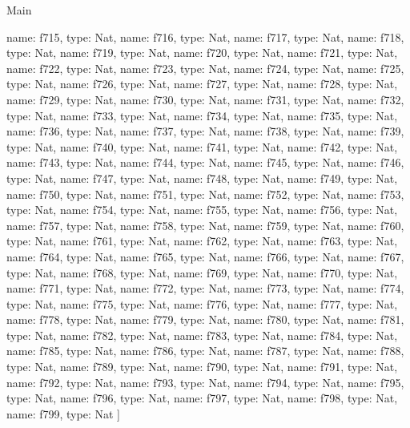 \begin{lexlean}{Main}
\begin{semanticmodule}
{    {name: f715, type: Nat},
    {name: f716, type: Nat},
    {name: f717, type: Nat},
    {name: f718, type: Nat},
    {name: f719, type: Nat},
    {name: f720, type: Nat},
    {name: f721, type: Nat},
    {name: f722, type: Nat},
    {name: f723, type: Nat},
    {name: f724, type: Nat},
    {name: f725, type: Nat},
    {name: f726, type: Nat},
    {name: f727, type: Nat},
    {name: f728, type: Nat},
    {name: f729, type: Nat},
    {name: f730, type: Nat},
    {name: f731, type: Nat},
    {name: f732, type: Nat},
    {name: f733, type: Nat},
    {name: f734, type: Nat},
    {name: f735, type: Nat},
    {name: f736, type: Nat},
    {name: f737, type: Nat},
    {name: f738, type: Nat},
    {name: f739, type: Nat},
    {name: f740, type: Nat},
    {name: f741, type: Nat},
    {name: f742, type: Nat},
    {name: f743, type: Nat},
    {name: f744, type: Nat},
    {name: f745, type: Nat},
    {name: f746, type: Nat},
    {name: f747, type: Nat},
    {name: f748, type: Nat},
    {name: f749, type: Nat},
    {name: f750, type: Nat},
    {name: f751, type: Nat},
    {name: f752, type: Nat},
    {name: f753, type: Nat},
    {name: f754, type: Nat},
    {name: f755, type: Nat},
    {name: f756, type: Nat},
    {name: f757, type: Nat},
    {name: f758, type: Nat},
    {name: f759, type: Nat},
    {name: f760, type: Nat},
    {name: f761, type: Nat},
    {name: f762, type: Nat},
    {name: f763, type: Nat},
    {name: f764, type: Nat},
    {name: f765, type: Nat},
    {name: f766, type: Nat},
    {name: f767, type: Nat},
    {name: f768, type: Nat},
    {name: f769, type: Nat},
    {name: f770, type: Nat},
    {name: f771, type: Nat},
    {name: f772, type: Nat},
    {name: f773, type: Nat},
    {name: f774, type: Nat},
    {name: f775, type: Nat},
    {name: f776, type: Nat},
    {name: f777, type: Nat},
    {name: f778, type: Nat},
    {name: f779, type: Nat},
    {name: f780, type: Nat},
    {name: f781, type: Nat},
    {name: f782, type: Nat},
    {name: f783, type: Nat},
    {name: f784, type: Nat},
    {name: f785, type: Nat},
    {name: f786, type: Nat},
    {name: f787, type: Nat},
    {name: f788, type: Nat},
    {name: f789, type: Nat},
    {name: f790, type: Nat},
    {name: f791, type: Nat},
    {name: f792, type: Nat},
    {name: f793, type: Nat},
    {name: f794, type: Nat},
    {name: f795, type: Nat},
    {name: f796, type: Nat},
    {name: f797, type: Nat},
    {name: f798, type: Nat},
    {name: f799, type: Nat}
  ]
}


\end{semanticmodule}
\end{lexlean}
